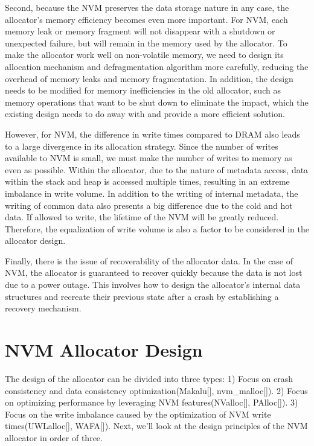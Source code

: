 \documentclass[sigconf]{acmart}
\begin{document}
Second, because the NVM preserves the data storage nature in any case, the allocator's memory efficiency becomes even more important. For NVM, each memory leak or memory fragment will not disappear with a shutdown or unexpected failure, but will remain in the memory used by the allocator. To make the allocator work well on non-volatile memory, we need to design its allocation mechanism and defragmentation algorithm more carefully, reducing the overhead of memory leaks and memory fragmentation. In addition, the design needs to be modified for memory inefficiencies in the old allocator, such as memory operations that want to be shut down to eliminate the impact, which the existing design needs to do away with and provide a more efficient solution.

However, for NVM, the difference in write times compared to DRAM also leads to a large divergence in its allocation strategy. Since the number of writes available to NVM is small, we must make the number of writes to memory as even as possible. Within the allocator, due to the nature of metadata access, data within the stack and heap is accessed multiple times, resulting in an extreme imbalance in write volume. In addition to the writing of internal metadata, the writing of common data also presents a big difference due to the cold and hot data. If allowed to write, the lifetime of the NVM will be greatly reduced. Therefore, the equalization of write volume is also a factor to be considered in the allocator design.

Finally, there is the issue of recoverability of the allocator data. In the case of NVM, the allocator is guaranteed to recover quickly because the data is not lost due to a power outage. This involves how to design the allocator's internal data structures and recreate their previous state after a crash by establishing a recovery mechanism.

\section{NVM Allocator Design}

The design of the allocator can be divided into three types: 1) Focus on crash consistency and data consistency optimization(Makalu[], nvm\_malloc[]). 2) Focus on optimizing performance by leveraging NVM features(NValloc[], PAlloc[]). 3) Focus on the write imbalance caused by the optimization of NVM write times(UWLalloc[], WAFA[]). Next, we'll look at the design principles of the NVM allocator in order of three.
\end{document}

